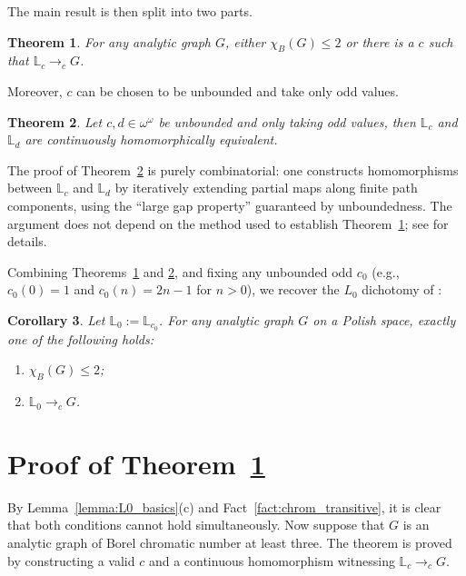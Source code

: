 \documentclass[11pt]{article}
\theoremstyle{plain}
\newtheorem{theorem}{Theorem}[section]
\newtheorem{corollary}[theorem]{Corollary}
\theoremstyle{definition}
\theoremstyle{remark}
\begin{document}
The main result is then split into two parts.

\begin{theorem}\label{thm:L0-hom-equivalent-main}
    For any analytic graph $G$, either $\chi_B(G)\leq 2$ or there is a $c$ such that $\mathbb L_c\to_cG$.
\end{theorem}

Moreover, $c$ can be chosen to be unbounded and take only odd values.

\begin{theorem}\label{thm:L0-hom-equivalent}
    Let $c,d\in\omega^\omega$ be unbounded and only taking odd values, then $\mathbb L_c$ and $\mathbb L_d$ are continuously homomorphically equivalent.
\end{theorem}

The proof of Theorem~\ref{thm:L0-hom-equivalent} is purely combinatorial: one constructs homomorphisms between $\mathbb L_c$ and $\mathbb L_d$ by iteratively extending partial maps along finite path components, using the ``large gap property'' guaranteed by unboundedness.
The argument does not depend on the method used to establish Theorem~\ref{thm:L0-hom-equivalent-main}; see \cite[Proposition~4.2 and Claim~4.1]{L0paper} for details.

Combining Theorems~\ref{thm:L0-hom-equivalent-main} and \ref{thm:L0-hom-equivalent}, and fixing any unbounded odd $c_0$ (e.g., $c_0(0)=1$ and $c_0(n)=2n-1$ for $n>0$), we recover the $L_0$ dichotomy of \cite{L0paper}:

\begin{corollary}
    Let $\mathbb L_0:=\mathbb L_{c_0}$.
    For any analytic graph $G$ on a Polish space, exactly one of the following holds:
    \begin{enumerate}
        \item $\chi_B(G)\leq 2$;
        \item $\mathbb L_0\to_cG$.
    \end{enumerate}
\end{corollary}

\section{Proof of Theorem~\ref{thm:L0-hom-equivalent-main}}

By Lemma~\ref{lemma:L0_basics}(c) and Fact~\ref{fact:chrom_transitive}, it is clear that both conditions cannot hold simultaneously.
Now suppose that $G$ is an analytic graph of Borel chromatic number at least three.
The theorem is proved by constructing a valid $c$ and a continuous homomorphism witnessing $\mathbb L_c\to_cG$.
\end{document}
